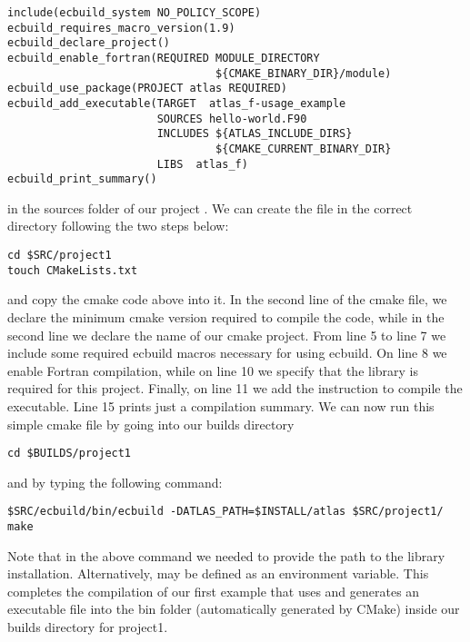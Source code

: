 \begin{description}
\begin{lstlisting}[style=XMLStyle]
include(ecbuild_system NO_POLICY_SCOPE)
ecbuild_requires_macro_version(1.9)
ecbuild_declare_project()
ecbuild_enable_fortran(REQUIRED MODULE_DIRECTORY 
                                ${CMAKE_BINARY_DIR}/module)
ecbuild_use_package(PROJECT atlas REQUIRED)
ecbuild_add_executable(TARGET  atlas_f-usage_example
                       SOURCES hello-world.F90 
                       INCLUDES ${ATLAS_INCLUDE_DIRS}
                                ${CMAKE_CURRENT_BINARY_DIR}
                       LIBS  atlas_f)
ecbuild_print_summary()
\end{lstlisting}
%
in the sources folder of our project .
We can create the  file in the correct 
directory following the two steps below:
%
\begin{lstlisting}[style=BashStyle]
cd $SRC/project1
touch CMakeLists.txt
\end{lstlisting}
%
and copy the cmake code above into it.
In the second line of the cmake file, we declare the minimum cmake 
version required to compile the code, while in the second line 
we declare the name of our cmake project. 
From line 5 to line 7 we include some required ecbuild macros 
necessary for using ecbuild. On line 8 we enable Fortran compilation, 
while on line 10 we specify that the \Atlas library is required for 
this project. Finally, on line 11 we add the instruction to 
compile the executable.
Line 15 prints just a compilation summary. We can now run this simple 
cmake file by going into our builds directory 
%
\begin{lstlisting}[style=BashStyle]
cd $BUILDS/project1
\end{lstlisting}
%  
and by typing the following command:
%
\begin{lstlisting}[style=BashStyle]
$SRC/ecbuild/bin/ecbuild -DATLAS_PATH=$INSTALL/atlas $SRC/project1/
make 
\end{lstlisting}
%  
Note that in the above command we needed to provide the path 
to the \Atlas library installation.  Alternatively,
 may be defined as an environment variable.
This completes the compilation of our first example that uses
\Atlas and generates an executable file into the bin folder 
(automatically generated by CMake) inside our builds directory
for project1.
\end{description}
%


